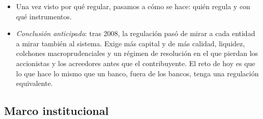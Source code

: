 \documentclass[11pt]{article}
\begin{document}
\begin{itemize}
\item Una vez visto por qué regular, pasamos a cómo se hace: quién regula y con qué instrumentos.
\item \emph{Conclusión anticipada}: tras 2008, la regulación pasó de mirar a cada entidad a mirar también al sistema. Exige más capital y de más calidad, liquidez, colchones macroprudenciales y un régimen de resolución en el que pierdan los accionistas y los acreedores antes que el contribuyente. El reto de hoy es que lo que hace lo mismo que un banco, fuera de los bancos, tenga una regulación equivalente.
\end{itemize}

\subsection{Marco institucional}\label{sec:marco}
\end{document}
